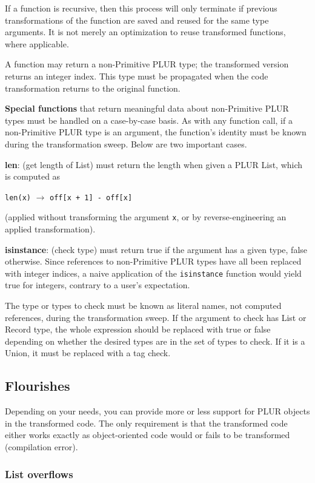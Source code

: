 \documentclass[10pt, conference, compsocconf]{IEEEtran}
\begin{document}
If a function is recursive, then this process will only terminate if previous transformations of the function are saved and reused for the same type arguments. It is not merely an optimization to reuse transformed functions, where applicable.

A function may return a non-Primitive PLUR type; the transformed version returns an integer index. This type must be propagated when the code transformation returns to the original function.

{\bf Special functions} that return meaningful data about non-Primitive PLUR types must be handled on a case-by-case basis. As with any function call, if a non-Primitive PLUR type is an argument, the function's identity must be known during the transformation sweep. Below are two important cases.

{\bf len}: (get length of List) must return the length when given a PLUR List, which is computed as
\begin{center}
{\tt len(x)} $\to$ {\tt off[x + 1] - off[x]}
\end{center}
(applied without transforming the argument {\tt x}, or by reverse-engineering an applied transformation).

{\bf isinstance}: (check type) must return true if the argument has a given type, false otherwise. Since references to non-Primitive PLUR types have all been replaced with integer indices, a naive application of the {\tt isinstance} function would yield true for integers, contrary to a user's expectation.

The type or types to check must be known as literal names, not computed references, during the transformation sweep. If the argument to check has List or Record type, the whole expression should be replaced with true or false depending on whether the desired types are in the set of types to check. If it is a Union, it must be replaced with a tag check.

\subsection{Flourishes}

Depending on your needs, you can provide more or less support for PLUR objects in the transformed code. The only requirement is that the transformed code either works exactly as object-oriented code would or fails to be transformed (compilation error).

\subsubsection{List overflows}
\end{document}
